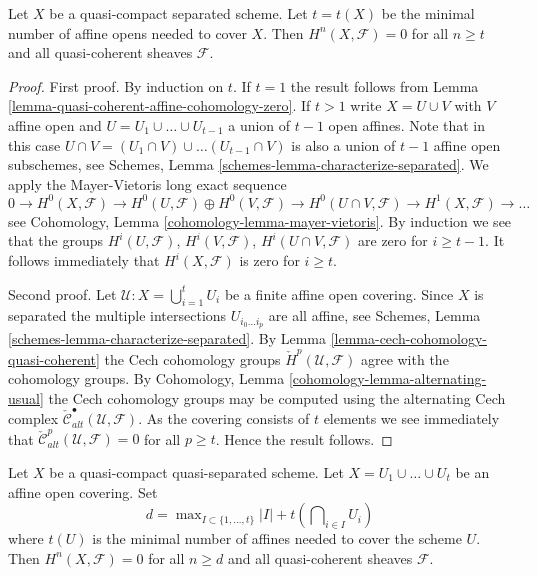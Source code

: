 \begin{lemma}
\label{lemma-vanishing-nr-affines}
Let $X$ be a quasi-compact separated scheme.
Let $t = t(X)$ be the minimal number of affine opens needed to
cover $X$.
Then $H^n(X, \mathcal{F}) = 0$ for all $n \geq t$ and all
quasi-coherent sheaves $\mathcal{F}$.
\end{lemma}

\begin{proof}
First proof.
By induction on $t$.
If $t = 1$ the result follows from
Lemma \ref{lemma-quasi-coherent-affine-cohomology-zero}.
If $t > 1$ write $X = U \cup V$ with $V$ affine open and
$U = U_1 \cup \ldots \cup U_{t - 1}$ a union of $t - 1$ open affines.
Note that in this case
$U \cap V =  (U_1 \cap V) \cup \ldots (U_{t - 1} \cap V)$
is also a union of $t - 1$ affine open subschemes, see
Schemes, Lemma \ref{schemes-lemma-characterize-separated}.
We apply the Mayer-Vietoris long exact sequence
$$
0 \to
H^0(X, \mathcal{F}) \to
H^0(U, \mathcal{F}) \oplus H^0(V, \mathcal{F}) \to
H^0(U \cap V, \mathcal{F}) \to
H^1(X, \mathcal{F}) \to \ldots
$$
see Cohomology, Lemma \ref{cohomology-lemma-mayer-vietoris}.
By induction we see that the groups $H^i(U, \mathcal{F})$,
$H^i(V, \mathcal{F})$, $H^i(U \cap V, \mathcal{F})$ are zero for
$i \geq t - 1$. It follows immediately that $H^i(X, \mathcal{F})$
is zero for $i \geq t$.

\medskip\noindent
Second proof.
Let $\mathcal{U} : X = \bigcup_{i = 1}^t U_i$ be a finite affine open
covering. Since $X$ is separated the multiple intersections
$U_{i_0 \ldots i_p}$ are all affine, see
Schemes, Lemma \ref{schemes-lemma-characterize-separated}.
By Lemma \ref{lemma-cech-cohomology-quasi-coherent} the Cech
cohomology groups $\check{H}^p(\mathcal{U}, \mathcal{F})$
agree with the cohomology groups. By
Cohomology, Lemma \ref{cohomology-lemma-alternating-usual}
the Cech cohomology groups may be computed using the alternating
Cech complex $\check{\mathcal{C}}_{alt}^\bullet(\mathcal{U}, \mathcal{F})$.
As the covering consists of $t$ elements we see immediately
that $\check{\mathcal{C}}_{alt}^p(\mathcal{U}, \mathcal{F}) = 0$
for all $p \geq t$. Hence the result follows.
\end{proof}

\begin{lemma}
\label{lemma-vanishing-nr-affines-quasi-separated}
Let $X$ be a quasi-compact quasi-separated scheme.
Let $X = U_1 \cup \ldots \cup U_t$ be an affine open covering.
Set
$$
d = \max\nolimits_{I \subset \{1, \ldots, t\}}
|I| + t(\bigcap\nolimits_{i \in I} U_i)
$$
where $t(U)$ is the minimal number of affines needed to cover
the scheme $U$. Then $H^n(X, \mathcal{F}) = 0$ for all $n \geq d$ and all
quasi-coherent sheaves $\mathcal{F}$.
\end{lemma}

